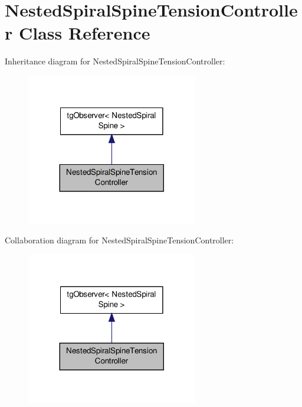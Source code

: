 \hypertarget{class_nested_spiral_spine_tension_controller}{\section{Nested\-Spiral\-Spine\-Tension\-Controller Class Reference}
\label{class_nested_spiral_spine_tension_controller}
}


Inheritance diagram for Nested\-Spiral\-Spine\-Tension\-Controller\-:\nopagebreak
\begin{figure}[H]
\begin{center}
\leavevmode
\includegraphics[width=212pt]{class_nested_spiral_spine_tension_controller__inherit__graph}
\end{center}
\end{figure}


Collaboration diagram for Nested\-Spiral\-Spine\-Tension\-Controller\-:\nopagebreak
\begin{figure}[H]
\begin{center}
\leavevmode
\includegraphics[width=212pt]{class_nested_spiral_spine_tension_controller__coll__graph}
\end{center}
\end{figure}
